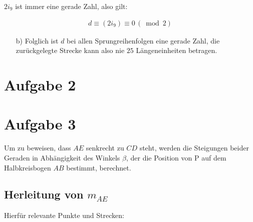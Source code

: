 \documentclass[12pt,a4paper,oneside]{article}
\begin{document}
$2 i_9$ ist immer eine gerade Zahl, also gilt:

\begin{align*}
	d \equiv (2 i_9) \equiv 0 \, (\bmod 2)
\end{align*}

\begin{itemize}
	\item[b)] Folglich ist $d$ bei allen Sprungreihenfolgen eine gerade Zahl, die zurückgelegte Strecke kann also nie $25$ Längeneinheiten betragen.
\end{itemize}

\pagebreak
\section[]{Aufgabe 2}

\pagebreak
\section[]{Aufgabe 3}
Um zu beweisen, dass $AE$ senkrecht zu $CD$ steht, werden die Steigungen beider Geraden in Abhängigkeit des Winkels $\beta$, der die Position von P auf dem Halbkreisbogen $AB$ bestimmt, berechnet.

\subsection[]{Herleitung von $m_{AE}$}
Hierfür relevante Punkte und Strecken:
\end{document}
